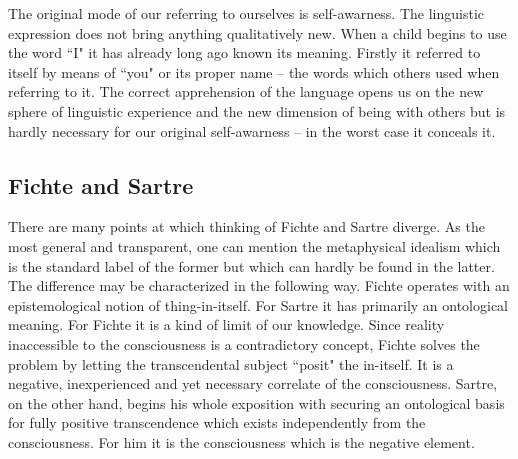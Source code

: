 The original mode of our referring to ourselves is self-awarness. The linguistic expression does not bring 
anything qualitatively new. When a child begins to use the word ``I" it has already long ago known its meaning. 
Firstly it referred to itself by means of ``you" or its proper name -- the words which others used when referring to it. 
The correct apprehension of the language opens us on the new sphere of linguistic experience and the new 
dimension of being with others but is hardly necessary for our original self-awarness -- in the worst case it conceals 
it.

\subsection{Fichte and Sartre}

There are many points at which thinking of Fichte and Sartre diverge. As the most general and transparent, 
one can mention the metaphysical idealism which is the standard label of the former but which can hardly be found 
in the latter. The difference may be characterized in the following way. Fichte operates with an epistemological 
notion of thing-in-itself. For Sartre it has primarily an ontological meaning. For Fichte it is a kind of limit of our 
knowledge. Since reality inaccessible to the consciousness is a contradictory concept, Fichte solves the problem by 
letting the transcendental subject ``posit" the in-itself. It is a negative, inexperienced and yet necessary correlate of 
the consciousness. Sartre, on the other hand, begins his whole exposition with securing an ontological basis for 
fully positive transcendence which exists independently from the consciousness. For him it is the consciousness 
which is the negative element. 

